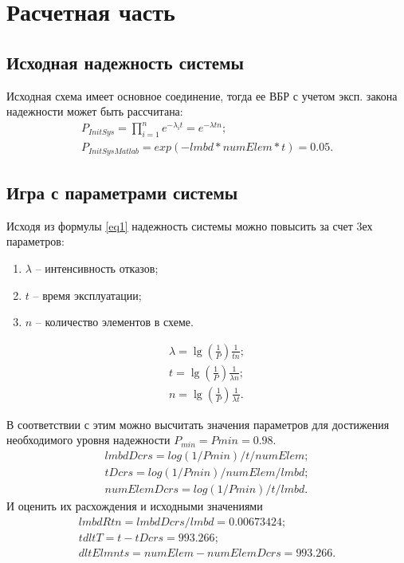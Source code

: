 \chapter{Расчетная часть}
\section{Исходная надежность системы}
	Исходная схема имеет основное соединение, тогда ее ВБР с учетом эксп. закона надежности может быть рассчитана:
	\begin{gather}
		P_{InitSys} = \prod\limits_{i=1}^{n}e^{-\lambda_{i} t} = e^{-\lambda t n} ;\label{eq1}\\
		P_{InitSysMatlab} = exp(-lmbd*numElem*t) = 0.05.
	\end{gather}
\section{Игра с параметрами системы}
	Исходя из формулы \ref{eq1} надежность системы можно повысить за счет 3ех параметров:
	\begin{enumerate}
		\item $\lambda$ -- интенсивность отказов;
		\item $t$ -- время эксплуатации;
		\item $n$ -- количество элементов в схеме.
	\end{enumerate}
	\begin{gather}
		\lambda = \lg(\frac{1}{P})\frac{1}{t n};\\
		t = \lg(\frac{1}{P})\frac{1}{\lambda n};\\
		n = \lg(\frac{1}{P})\frac{1}{\lambda t}.
	\end{gather}

	В соответствии с этим можно высчитать значения параметров для достижения необходимого уровня надежности $P_{min} = Pmin = 0.98$.
	\begin{gather*}
		lmbdDcrs = log(1/Pmin)/t/numElem;\\
		tDcrs = log(1/Pmin)/numElem/lmbd;\\
		numElemDcrs = log(1/Pmin)/t/lmbd.
	\end{gather*}
	И оценить их расхождения и исходными значениями
	\begin{gather*}
		lmbdRtn = lmbdDcrs/lmbd = 0.00673424;\\
		tdltT = t - tDcrs  = 993.266;\\
		dltElmnts = numElem - numElemDcrs = 993.266.\\
	\end{gather*}

